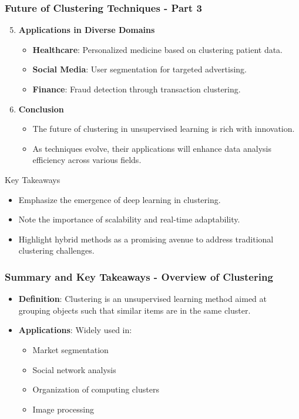 \documentclass[aspectratio=169]{beamer}
\begin{document}
\begin{frame}[fragile]
    \frametitle{Future of Clustering Techniques - Part 3}
    \begin{enumerate}
        \setcounter{enumi}{4}
        \item \textbf{Applications in Diverse Domains}
            \begin{itemize}
                \item \textbf{Healthcare}: Personalized medicine based on clustering patient data.
                \item \textbf{Social Media}: User segmentation for targeted advertising.
                \item \textbf{Finance}: Fraud detection through transaction clustering.
            \end{itemize}
        \item \textbf{Conclusion}
            \begin{itemize}
                \item The future of clustering in unsupervised learning is rich with innovation.
                \item As techniques evolve, their applications will enhance data analysis efficiency across various fields.
            \end{itemize}
    \end{enumerate}
    \begin{block}{Key Takeaways}
        \begin{itemize}
            \item Emphasize the emergence of deep learning in clustering.
            \item Note the importance of scalability and real-time adaptability.
            \item Highlight hybrid methods as a promising avenue to address traditional clustering challenges.
        \end{itemize}
    \end{block}
\end{frame}

\begin{frame}[fragile]
    \frametitle{Summary and Key Takeaways - Overview of Clustering}
    \begin{itemize}
        \item \textbf{Definition}: Clustering is an unsupervised learning method aimed at grouping objects such that similar items are in the same cluster.
        \item \textbf{Applications}: Widely used in:
        \begin{itemize}
            \item Market segmentation
            \item Social network analysis
            \item Organization of computing clusters
            \item Image processing
        \end{itemize}
    \end{itemize}
\end{frame}
\end{document}
